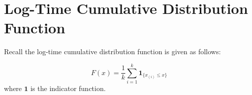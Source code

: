 \section{Log-Time Cumulative Distribution Function}
\label{apd:ltcdf}


Recall the log-time cumulative distribution function is given as follows:

\[
   F(x) = \frac{1}{k} \sum_{i=1}^k \mathbf{1}_{\{x_{(i)} \leq x\}}
\]
where $\mathbf{1}$ is the indicator function.


